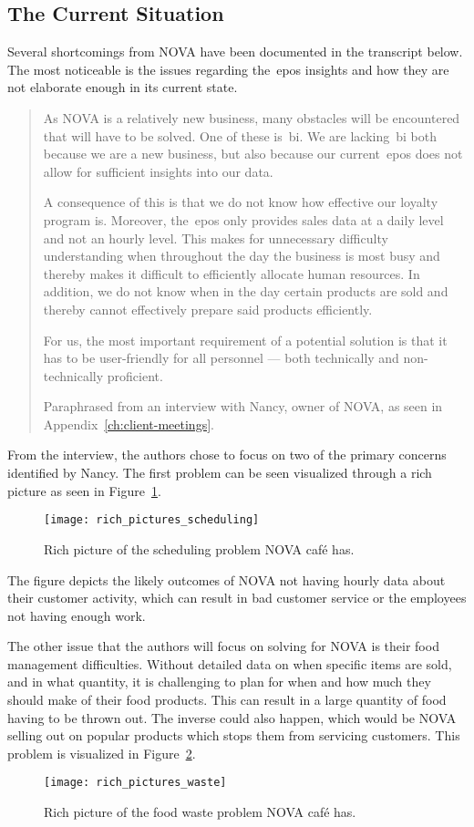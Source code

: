 \subsection{The Current Situation}\label{subsec:the-current-situation}

Several shortcomings from NOVA have been documented in the transcript below.
The most noticeable is the issues regarding the~\acrfull{epos} insights and how they are not elaborate enough in its
current state.

\blockquote[Paraphrased from an interview with Nancy, owner of NOVA, as seen in Appendix~\ref{ch:client-meetings}.]
{As NOVA is a
relatively new business, many
obstacles will be encountered that will have to be solved.
One of these is~\acrfull{bi}.
We are lacking~\acrshort{bi} both because we are a new business, but also because our current~\acrshort{epos} does not
allow for sufficient insights into our data.

A consequence of this is that we do not know how effective our loyalty program is.
Moreover, the~\acrshort{epos} only provides sales data at a daily level and not an hourly level.
This makes for unnecessary difficulty understanding when throughout the day the business is most busy and thereby makes
it difficult to efficiently allocate human resources.
In addition, we do not know when in the day certain products are sold and thereby cannot effectively prepare said
products efficiently.

For us, the most important requirement of a potential solution is that it has to be user-friendly for all personnel —
both technically and non-technically proficient.}

From the interview, the authors chose to focus on two of the primary
concerns identified by Nancy.
The first problem can be seen visualized through a rich picture as seen in Figure~\ref{fig:pda-scheduling-problem}.

\begin{figure}[H]
    \centering
    \texttt{[image: rich\_pictures\_scheduling]}
    \caption{Rich picture of the scheduling problem NOVA café has.
    }\label{fig:pda-scheduling-problem}
\end{figure}

The figure depicts the likely outcomes of NOVA not having hourly data about their customer activity,
which can result in bad customer service or the employees not having enough work.

The other issue that the authors will focus on solving for NOVA is their food management difficulties.
Without detailed data on when specific items are sold, and in what quantity, it is challenging to plan
for when and how much they should make of their food products.
This can result in a large quantity of food having to be thrown out.
The inverse could also happen, which would be NOVA selling out on popular products which stops them
from servicing customers.
This problem is visualized in Figure~\ref{fig:pda-waste-problem}.

\begin{figure}[H]
    \centering
    \texttt{[image: rich\_pictures\_waste]}
    \caption{Rich picture of the food waste problem NOVA café has.
    }\label{fig:pda-waste-problem}
\end{figure}
